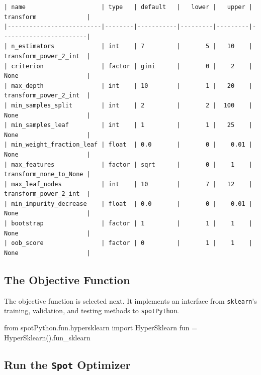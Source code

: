 \documentclass[
  letterpaper,
  DIV=11,
  numbers=noendperiod]{scrreprt}
\newenvironment{Shaded}{\begin{snugshade}}{\end{snugshade}}
\newcommand{\ImportTok}[1]{\textcolor[rgb]{0.00,0.46,0.62}{#1}}
\newcommand{\NormalTok}[1]{\textcolor[rgb]{0.00,0.23,0.31}{#1}}
\newcommand{\OperatorTok}[1]{\textcolor[rgb]{0.37,0.37,0.37}{#1}}
\begin{document}
\begin{verbatim}
| name                     | type   | default   |   lower |   upper | transform              |
|--------------------------|--------|-----------|---------|---------|------------------------|
| n_estimators             | int    | 7         |       5 |   10    | transform_power_2_int  |
| criterion                | factor | gini      |       0 |    2    | None                   |
| max_depth                | int    | 10        |       1 |   20    | transform_power_2_int  |
| min_samples_split        | int    | 2         |       2 |  100    | None                   |
| min_samples_leaf         | int    | 1         |       1 |   25    | None                   |
| min_weight_fraction_leaf | float  | 0.0       |       0 |    0.01 | None                   |
| max_features             | factor | sqrt      |       0 |    1    | transform_none_to_None |
| max_leaf_nodes           | int    | 10        |       7 |   12    | transform_power_2_int  |
| min_impurity_decrease    | float  | 0.0       |       0 |    0.01 | None                   |
| bootstrap                | factor | 1         |       1 |    1    | None                   |
| oob_score                | factor | 0         |       1 |    1    | None                   |
\end{verbatim}

\hypertarget{sec-the-objective-function-16}{%
\subsection{The Objective
Function}\label{sec-the-objective-function-16}}

The objective function is selected next. It implements an interface from
\texttt{sklearn}'s training, validation, and testing methods to
\texttt{spotPython}.

\begin{Shaded}
\begin{Highlighting}[]
\ImportTok{from}\NormalTok{ spotPython.fun.hypersklearn }\ImportTok{import}\NormalTok{ HyperSklearn}
\NormalTok{fun }\OperatorTok{=}\NormalTok{ HyperSklearn().fun\_sklearn}
\end{Highlighting}
\end{Shaded}

\hypertarget{run-the-spot-optimizer-1}{%
\subsection{\texorpdfstring{Run the \texttt{Spot}
Optimizer}{Run the Spot Optimizer}}\label{run-the-spot-optimizer-1}}
\end{document}

